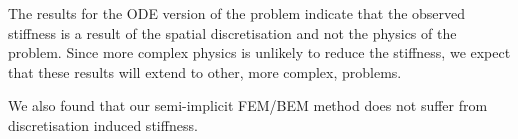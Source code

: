 The results for the ODE version of the problem indicate that the observed stiffness is a result of the spatial discretisation and not the physics of the problem.
Since more complex physics is unlikely to reduce the stiffness, we expect that these results will extend to other, more complex, problems.

We also found that our semi-implicit FEM/BEM method does not suffer from discretisation induced stiffness.


